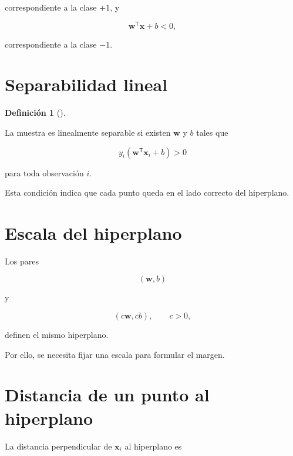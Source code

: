 \documentclass[
  spanish,
  10.5pt,
  letterpaper,
  DIV=11,
  numbers=noendperiod,
  oneside,
  open=any]{scrreprt}
\theoremstyle{definition}
\newtheorem{definition}{Definición}[chapter]
\theoremstyle{definition}
\theoremstyle{plain}
\theoremstyle{remark}
\begin{document}
correspondiente a la clase \(+1\), y

\[
\mathbf{w}^{\mathsf T}\mathbf{x}+b<0,
\]

correspondiente a la clase \(-1\).

\section*{Separabilidad lineal}\label{separabilidad-lineal}


\begin{definition}[]\protect\hypertarget{def-separabilidad-lineal}{}\label{def-separabilidad-lineal}

La muestra es linealmente separable si existen \(\mathbf{w}\) y \(b\)
tales que

\[
y_i
\left(
\mathbf{w}^{\mathsf T}\mathbf{x}_i+b
\right)
>0
\]

para toda observación \(i\).

\end{definition}

Esta condición indica que cada punto queda en el lado correcto del
hiperplano.

\section*{Escala del hiperplano}\label{escala-del-hiperplano}


Los pares

\[
(\mathbf{w},b)
\]

y

\[
(c\mathbf{w},cb),
\qquad c>0,
\]

definen el mismo hiperplano.

Por ello, se necesita fijar una escala para formular el margen.

\section*{Distancia de un punto al
hiperplano}\label{distancia-de-un-punto-al-hiperplano}


La distancia perpendicular de \(\mathbf{x}_i\) al hiperplano es
\end{document}
